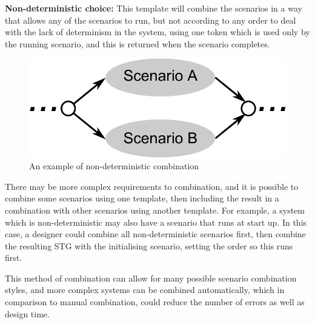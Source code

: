 \documentclass[british,compsoc]{IEEEtran}
\begin{document}
\textbf{Non-deterministic choice:} This template will combine the
scenarios in a way that allows any of the scenarios to run, but not
according to any order to deal with the lack of determinism in the
system, using one token which is used only by the running scenario,
and this is returned when the scenario completes.

\begin{figure}[h]
\begin{centering}
\includegraphics[scale=0.45]{Images/non_deterministic_combination}
\par\end{centering}

\begin{centering}
\protect\caption{\label{fig:non_deterministic_combination}An example of non-deterministic combination}

\par\end{centering}

\end{figure}

There may be more complex requirements to combination, and it
is possible to combine some scenarios using one template, then including
the result in a combination with other scenarios using another template. For example, a
system which is non-deterministic may also have a scenario that runs
at start up. In this case, a designer could
combine all non-deterministic scenarios first, then combine the resulting
STG with the initialising scenario, setting the order so this runs
first.

This method of combination can allow for many possible scenario combination
styles, and more complex systems can be combined automatically, which
in comparison to manual combination, could reduce the number of errors
as well as design time.
\end{document}
